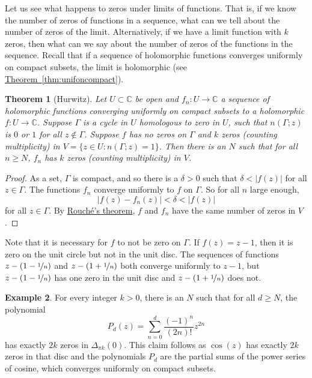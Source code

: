 \documentclass[12pt,openany]{book}
\newcommand{\sabs}[1]{\lvert {#1} \rvert}
\newcommand{\C}{{\mathbb{C}}}
\theoremstyle{plain}
\newtheorem{thm}{Theorem}[section]
\theoremstyle{remark}
\theoremstyle{definition}
\theoremstyle{exercise}
\theoremstyle{example}
\newtheorem{example}[thm]{Example}
\newcommand{\thmref}[1]{\hyperref[#1]{Theorem~\ref*{#1}}}
\begin{document}
Let us see what happens to zeros under limits of functions.
That is, if we know the number of zeros of functions in a sequence,
what can we tell about the number of zeros of the limit.  Alternatively,
if we have a limit function with $k$ zeros, then what can
we say about the number of zeros of the functions in the sequence.
Recall that if a sequence of holomorphic
functions converges uniformly on compact subsets, the limit is holomorphic
(see \thmref{thm:unifoncompact}).

\begin{thm}[Hurwitz]
Let $U \subset \C$ be open and $f_n \colon U \to \C$ a sequence of
holomorphic functions converging uniformly on compact subsets
to a holomorphic $f \colon U \to \C$.  Suppose $\Gamma$ is
a cycle in $U$ homologous to zero in $U$,
such that $n(\Gamma;z)$ is $0$ or $1$ for all $z \notin \Gamma$.
Suppose $f$ has no zeros on $\Gamma$ and $k$ zeros (counting
multiplicity) in $V = \bigl\{ z \in U : n(\Gamma;z) = 1 \bigr\}$.
Then there is an $N$ such that for all $n \geq N$,
$f_n$ has $k$ zeros (counting multiplicity) in $V$.
\end{thm}

\begin{proof}
As a set, $\Gamma$ is compact, and so
there is a $\delta > 0$ such that $\delta < \sabs{f(z)}$
for all $z \in \Gamma$.
The functions $f_n$
converge uniformly to $f$ on $\Gamma$.
So for all $n$ large enough,
\begin{equation*}
\sabs{f(z)-f_n(z)} < \delta < \sabs{f(z)}
\end{equation*}
for all $z \in \Gamma$.  By \hyperref[thm:rouche2]{Rouch\'e's theorem},
$f$ and $f_n$ have the same number of zeros in $V$.
\end{proof}

Note that it is necessary for $f$
to not be zero on $\Gamma$.  If $f(z) = z-1$, then it is zero on
the unit circle but not in the unit disc.
The sequences of functions $z-(1-\nicefrac{1}{n})$ and 
$z-(1+\nicefrac{1}{n})$ both converge uniformly to $z-1$, but
$z-(1-\nicefrac{1}{n})$ has one zero in the unit disc
and $z-(1+\nicefrac{1}{n})$ does not.

\begin{example}
For every integer $k > 0$, there is an $N$ such that
for all $d \geq N$,
the polynomial
\begin{equation*}
P_d(z) = \sum_{n=0}^d \frac{{(-1)}^n}{(2n)!}z^{2n}
\end{equation*}
has exactly $2k$ zeros in $\Delta_{\pi k}(0)$.
This claim follows as $\cos(z)$ has exactly $2k$ zeros in that disc
and the polynomials $P_d$ are the partial sums of the power series of
cosine, which converges uniformly on compact subsets.
\end{example}
  
\end{document}
